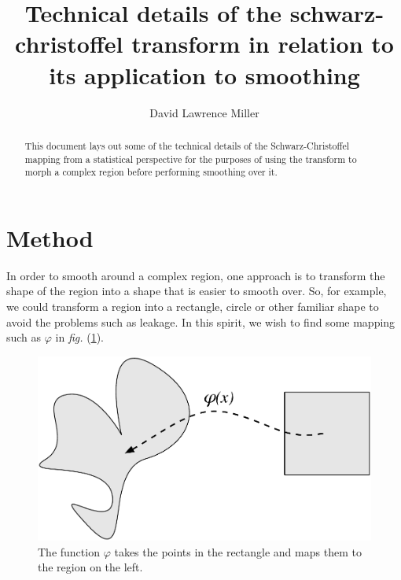 \documentclass[a4paper,10pt]{amsart}
\title{Technical details of the schwarz-christoffel transform in relation to its application to smoothing}
\author{David Lawrence Miller}
\newcommand{\sch}{Schwarz-Christoffel }
\newcommand{\fig}[1]{\emph{fig.} (\ref{#1})}
\renewcommand{\phi}{\varphi}
\begin{document}
 
\begin{abstract}
This document lays out some of the technical details of the \sch mapping from a statistical perspective for the purposes of using the transform to morph a complex region before performing smoothing over it. 
\end{abstract}
 
 
\newtheorem{thm}{Theorem}[section]
 
\newtheorem{defn}{Definition}[section]
 
\maketitle


\section{Method}

In order to smooth around a complex region, one approach is to transform the shape of the region into a shape that is easier to smooth over. So, for example, we could transform a region into a rectangle, circle or other familiar shape to avoid the problems such as leakage. In this spirit, we wish to find some mapping such as $\phi$ in \fig{simpledia}.

\begin{figure} [htbp]
\centering
\includegraphics[scale=0.3]{figs/simpledia.pdf}
\caption{The function $\phi$ takes the points in the rectangle and maps them to the region on the left.}
\label{simpledia}
\end{figure}
\end{document}
